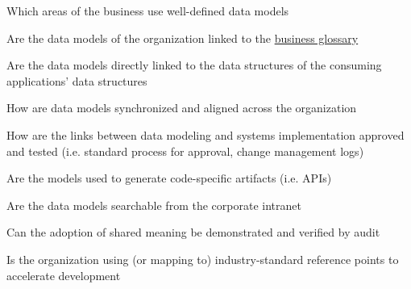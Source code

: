 \begin{core-questions}

  \item [\thesection.1] Which areas of the business use well-defined data models
  \item [\thesection.2] Are the data models of the organization linked to the
                        \hyperref[sec:ekg-mm-business-glossary]{business glossary}
  \item [\thesection.3] Are the data models directly linked to the data structures of the consuming applications'
                        data structures
  \item [\thesection.4] How are data models synchronized and aligned across the organization
  \item [\thesection.5] How are the links between data modeling and systems implementation approved and tested
                        (i.e. standard process for approval, change management logs)
  \item [\thesection.6] Are the models used to generate code-specific artifacts (i.e. APIs)
  \item [\thesection.7] Are the data models searchable from the corporate intranet
  \item [\thesection.8] Can the adoption of shared meaning be demonstrated and verified by audit
  \item [\thesection.9] Is the organization using (or mapping to) industry-standard reference points to
                        accelerate development

\end{core-questions}

\kgmmscoringsection

\kgmmscoringlevelOne

